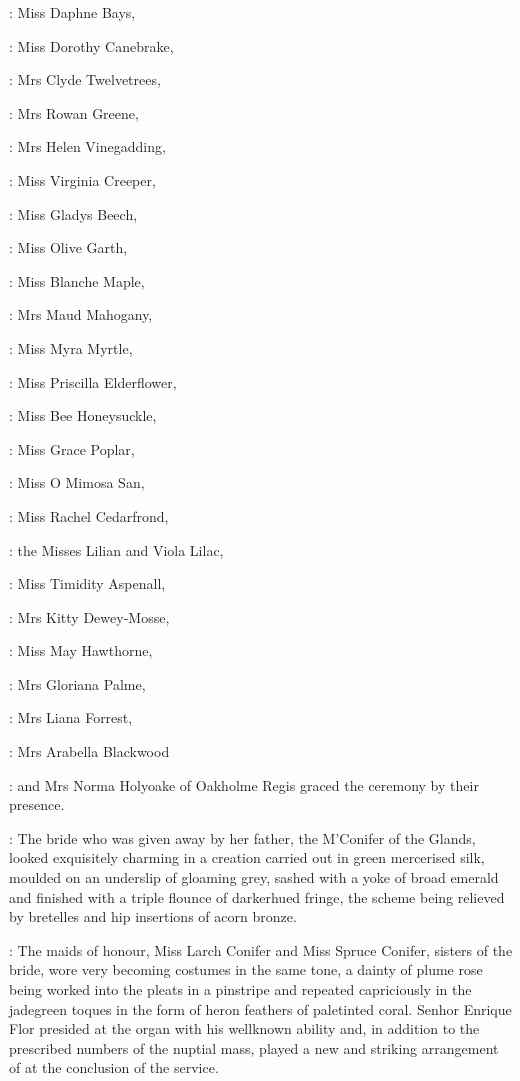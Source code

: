 :
Miss Daphne Bays, 

:
Miss Dorothy Canebrake, 

:
Mrs Clyde Twelvetrees, 

:
Mrs Rowan Greene, 

:
Mrs Helen Vinegadding, 

:
Miss Virginia Creeper, 

:
Miss Gladys Beech, 

:
Miss Olive Garth, 

:
Miss Blanche Maple, 

:
Mrs Maud Mahogany, 

:
Miss Myra Myrtle, 

:
Miss Priscilla Elderflower, 

:
Miss Bee Honeysuckle, 

:
Miss Grace Poplar, 

:
Miss O Mimosa San, 

:
Miss Rachel Cedarfrond, 

:
the Misses Lilian and Viola Lilac, 

:
Miss Timidity Aspenall, 

:
Mrs Kitty Dewey-Mosse, 

:
Miss May Hawthorne, 

:
Mrs Gloriana Palme, 

:
Mrs Liana Forrest, 

:
Mrs Arabella Blackwood

:
and Mrs Norma Holyoake of Oakholme Regis
graced the ceremony by their presence.

:
The bride who was given away by her father, the M'Conifer of
the Glands, looked exquisitely charming in a creation carried out in green
mercerised silk, moulded on an underslip of gloaming grey, sashed with a
yoke of broad emerald and finished with a triple flounce of darkerhued
fringe, the scheme being relieved by bretelles and hip insertions of acorn bronze.

:
The maids of honour, Miss Larch Conifer and Miss Spruce Conifer,
sisters of the bride, wore very becoming costumes in the same tone, a
dainty  of plume rose
being worked into the pleats in a pinstripe and
repeated capriciously in the jadegreen toques in the form of heron
feathers of paletinted coral. Senhor Enrique Flor presided at the
organ with his wellknown ability and, in addition to the prescribed
numbers of the nuptial mass, played a new and striking arrangement
of  at the conclusion of the
service.

